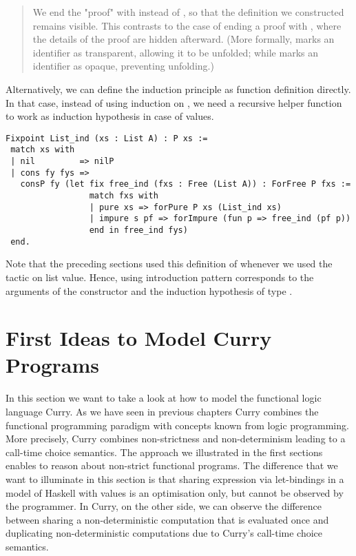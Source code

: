 \begin{quote}
We end the "proof" with  instead of , so that the definition we constructed remains visible.
This contrasts to the case of ending a proof with , where the details of the proof are hidden afterward.
(More formally,  marks an identifier as transparent, allowing it to be unfolded; while  marks an identifier as opaque, preventing unfolding.)
\end{quote}

Alternatively, we can define the induction principle as function definition directly.
In that case, instead of using induction on , we need a recursive helper function  to work as induction hypothesis in case of  values.

\begin{verbatim}
Fixpoint List_ind (xs : List A) : P xs :=
 match xs with
 | nil         => nilP
 | cons fy fys =>
   consP fy (let fix free_ind (fxs : Free (List A)) : ForFree P fxs :=
                 match fxs with
                 | pure xs => forPure P xs (List_ind xs)
                 | impure s pf => forImpure (fun p => free_ind (pf p))
                 end in free_ind fys)
 end.
\end{verbatim}

Note that the preceding sections used this definition of  whenever we used the tactic  on list
value.
Hence, using introduction pattern \cinl{[ | fy fys IH ]} corresponds to the arguments of the  constructor and the induction hypothesis of type .

\section{First Ideas to Model Curry Programs}

In this section we want to take a look at how to model the functional logic language Curry.
As we have seen in previous chapters Curry combines the functional programming paradigm with concepts known from logic programming.
More precisely, Curry combines non-strictness and non-determinism leading to a call-time choice semantics.
The approach we illustrated in the first sections enables to reason about non-strict functional programs.
The difference that we want to illuminate in this section is that sharing expression via let-bindings in a model of Haskell with
 values is an optimisation only, but cannot be observed by the programmer.
In Curry, on the other side, we can observe the difference between sharing a non-deterministic computation that is evaluated once and duplicating non-deterministic computations due to Curry's call-time choice semantics.

